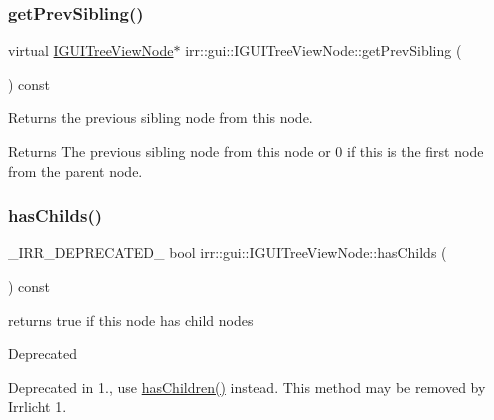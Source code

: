 \subsubsection{\texorpdfstring{get\+Prev\+Sibling()}{getPrevSibling()}}
{\footnotesize\ttfamily virtual \hyperlink{classirr_1_1gui_1_1IGUITreeViewNode}{I\+G\+U\+I\+Tree\+View\+Node}$\ast$ irr\+::gui\+::\+I\+G\+U\+I\+Tree\+View\+Node\+::get\+Prev\+Sibling (\begin{DoxyParamCaption}{ }\end{DoxyParamCaption}) const\hspace{0.3cm}{\ttfamily [pure virtual]}}



Returns the previous sibling node from this node. 

\begin{DoxyReturn}{Returns}
The previous sibling node from this node or 0 if this is the first node from the parent node. 
\end{DoxyReturn}
\mbox{\label{classirr_1_1gui_1_1IGUITreeViewNode_a7a771fc86d39a62487184bc56bcf8c52}} 
\subsubsection{\texorpdfstring{has\+Childs()}{hasChilds()}}
{\footnotesize\ttfamily \+\_\+\+I\+R\+R\+\_\+\+D\+E\+P\+R\+E\+C\+A\+T\+E\+D\+\_\+ bool irr\+::gui\+::\+I\+G\+U\+I\+Tree\+View\+Node\+::has\+Childs (\begin{DoxyParamCaption}{ }\end{DoxyParamCaption}) const\hspace{0.3cm}{\ttfamily [inline]}}



returns true if this node has child nodes 

\begin{DoxyRefDesc}{Deprecated}
\item[\hyperlink{deprecated__deprecated000008}{Deprecated}]Deprecated in 1., use \hyperlink{classirr_1_1gui_1_1IGUITreeViewNode_a64244b92443fefbd06c910daf5db3c5f}{has\+Children()} instead. This method may be removed by Irrlicht 1. \end{DoxyRefDesc}
\mbox{\label{classirr_1_1gui_1_1IGUITreeViewNode_abe890d4fde00a4a78fd5f2e39e104338}} 
